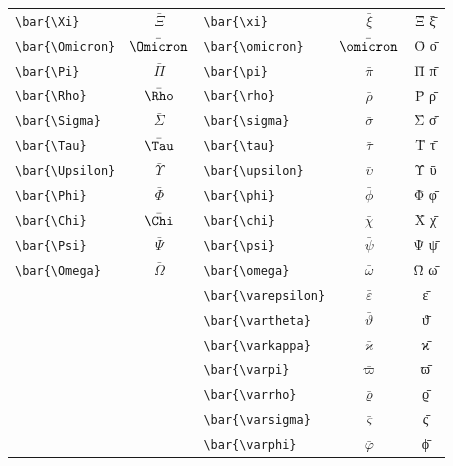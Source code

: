 \documentclass[12pt,a4paper]{article}
\begin{document}
\begin{longtable}{|l|c|l|c|c|}
\verb|\bar{\Xi}|         & $\bar{\Xi}$      & \verb|\bar{\xi}|         & $\bar{\xi}$         & Ξ̄ ξ̄ \\
\verb|\bar{\Omicron}|    & $\bar{\Omicron}$ & \verb|\bar{\omicron}|    & $\bar{\omicron}$    & Ο̄ ο̄ \\
\verb|\bar{\Pi}|         & $\bar{\Pi}$      & \verb|\bar{\pi}|         & $\bar{\pi}$         & Π̄ π̄ \\
\verb|\bar{\Rho}|        & $\bar{\Rho}$     & \verb|\bar{\rho}|        & $\bar{\rho}$        & Ρ̄ ρ̄ \\
\verb|\bar{\Sigma}|      & $\bar{\Sigma}$   & \verb|\bar{\sigma}|      & $\bar{\sigma}$      & Σ̄ σ̄ \\
\verb|\bar{\Tau}|        & $\bar{\Tau}$     & \verb|\bar{\tau}|        & $\bar{\tau}$        & Τ̄ τ̄ \\
\verb|\bar{\Upsilon}|    & $\bar{\Upsilon}$ & \verb|\bar{\upsilon}|    & $\bar{\upsilon}$    & Ῡ ῡ \\
\verb|\bar{\Phi}|        & $\bar{\Phi}$     & \verb|\bar{\phi}|        & $\bar{\phi}$        & Φ̄ φ̄ \\
\verb|\bar{\Chi}|        & $\bar{\Chi}$     & \verb|\bar{\chi}|        & $\bar{\chi}$        & Χ̄ χ̄ \\
\verb|\bar{\Psi}|        & $\bar{\Psi}$     & \verb|\bar{\psi}|        & $\bar{\psi}$        & Ψ̄ ψ̄ \\
\verb|\bar{\Omega}|      & $\bar{\Omega}$   & \verb|\bar{\omega}|      & $\bar{\omega}$      & Ω̄ ω̄ \\
                         &                  & \verb|\bar{\varepsilon}| & $\bar{\varepsilon}$ & ε̄ \\
                         &                  & \verb|\bar{\vartheta}|   & $\bar{\vartheta}$   & ϑ̄ \\
                         &                  & \verb|\bar{\varkappa}|   & $\bar{\varkappa}$   & ϰ̄ \\
                         &                  & \verb|\bar{\varpi}|      & $\bar{\varpi}$      & ϖ̄ \\
                         &                  & \verb|\bar{\varrho}|     & $\bar{\varrho}$     & ϱ̄ \\
                         &                  & \verb|\bar{\varsigma}|   & $\bar{\varsigma}$   & ς̄ \\
                         &                  & \verb|\bar{\varphi}|     & $\bar{\varphi}$     & ϕ̄ \\
\hline
\end{longtable}
\end{document}
